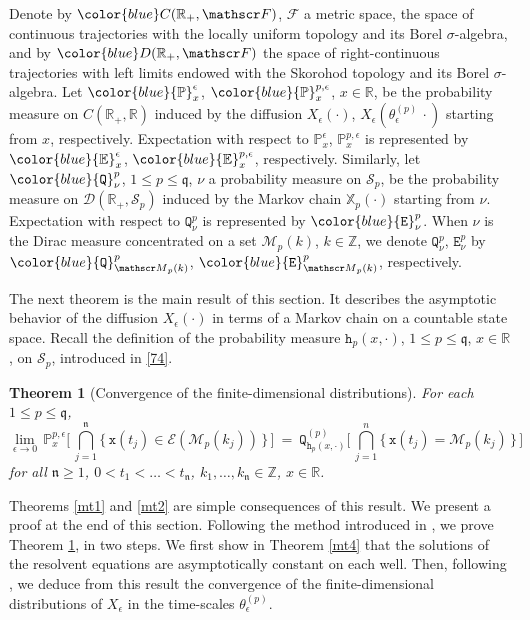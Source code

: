 \documentclass[reqno]{amsart}
\theoremstyle{plain}
\newtheorem{theorem}{Theorem}[section]
\theoremstyle{definition}
\newcommand{\mf}[1]{{\mathfrak #1}}
\newcommand{\bb}[1]{{\mathbb #1}}
\newcommand{\ms}[1]{{\mathscr #1}}
\newcommand{\mtt}[1]{{\mathtt #1}}
\newcounter{as}[section]
\newcommand{\<}{\langle}
\renewcommand{\>}{\rangle}
\begin{document}
Denote by $\color{blue} C(\bb R_{+}, \ms F)$, $\ms F$ a metric space,
the space of continuous trajectories with the locally uniform topology
and its Borel $\sigma$-algebra, and by
$\color{blue} D(\bb R_{+}, \ms F)$ the space of right-continuous
trajectories with left limits endowed with the Skorohod topology and
its Borel $\sigma$-algebra.  Let $\color{blue}\bb P^\epsilon_x$,
$\color{blue}\bb P^{p,\epsilon}_x$, $x\in \bb R$, be the probability
measure on $C(\bb R_{+}, \bb R)$ induced by the diffusion
$X_\epsilon(\cdot)$, $X_\epsilon(\theta^{(p)}_\epsilon\,\cdot)$
starting from $x$, respectively. Expectation with respect to
$\bb P^\epsilon_x$, $\bb P^{p,\epsilon}_x$ is represented by
$\color{blue}\bb E^\epsilon_x$, $\color{blue}\bb E^{p,\epsilon}_x$,
respectively.  Similarly, let $\color{blue}\mtt Q^{p}_{\nu}$,
$1\le p\le \mf q$, $\nu$ a probability measure on $\ms S_p$, be the
probability measure on $\ms D(\bb R_{+}, \ms S_p)$ induced by the
Markov chain $\bb X_p(\cdot)$ starting from $\nu$. Expectation with
respect to $\mtt Q^{p}_{\nu}$ is represented by
$\color{blue} \mtt E^{p}_{\nu}$. When $\nu$ is the Dirac measure
concentrated on a set $\ms M_p(k)$, $k\in\bb Z$, we denote
$\mtt Q^{p}_{\nu}$, $\mtt E^{p}_{\nu}$ by
$\color{blue}\mtt Q^{p}_{\ms M_p(k)}$,
$\color{blue}\mtt E^{p}_{\ms M_p(k)}$, respectively.


The next theorem is the main result of this section. It describes the
asymptotic behavior of the diffusion $X_\epsilon(\cdot)$ in terms of a
Markov chain on a countable state space. Recall the definition of the
probability measure $\mtt h_p(x, \cdot)$, $1\le p\le \mf q$,
$x\in \bb R$, on $\ms S_p$, introduced in \eqref{74}.

\begin{theorem}[Convergence of the finite-dimensional distributions]
\label{mt3}
For each $1\le p\le \mf q$, 
\begin{equation*}
\lim_{\epsilon\rightarrow0}\,
\mathbb{P}_{x}^{p,\epsilon}\Big[\,
\bigcap_{j=1}^{\mf n} \big\{\, \mtt x(t_{j})
\in \ms E (\ms M_p(k_j))\,\big\}\,\Big]
\ =\ \mtt Q^{(p)}_{\mtt h_p(x, \cdot)}
\Big[\,\bigcap_{j=1}^{n}
\big\{\, \mtt x (t_{j}) = \ms M_p( k_{j}) \,\big\}\,\Big]
\end{equation*}
for all $\mf n\ge 1$, $0<t_1< \dots <t_{\mf n}$,
$k_1, \dots, k_{\mf n} \in \bb Z$, $x\in \bb R$.
\end{theorem}

Theorems \ref{mt1} and \ref{mt2} are simple consequences of this
result. We present a proof at the end of this section. Following the
method introduced in \cite{lms}, we prove Theorem \ref{mt3}, in two
steps. We first show in Theorem \ref{mt4} that the solutions of the
resolvent equations are asymptotically constant on each well. Then,
following \cite{llm}, we deduce from this result the convergence of
the finite-dimensional distributions of $X_\epsilon$ in the
time-scales $\theta^{(p)}_\epsilon$.
\end{document}
